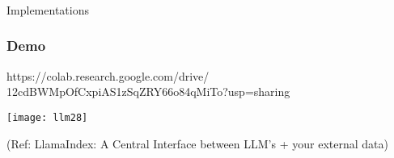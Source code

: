 \begin{frame}[fragile]\frametitle{}
\begin{center}
{\Large Implementations}
\end{center}
\end{frame}

\begin{frame}[fragile]\frametitle{Demo}

https://colab.research.google.com/drive/
12cdBWMpOfCxpiAS1zSqZRY66o84qMiTo?usp=sharing 


\begin{center}
\texttt{[image: llm28]}

{\tiny (Ref: LlamaIndex: A Central Interface between LLM’s + your external data)}
\end{center}
\end{frame}


